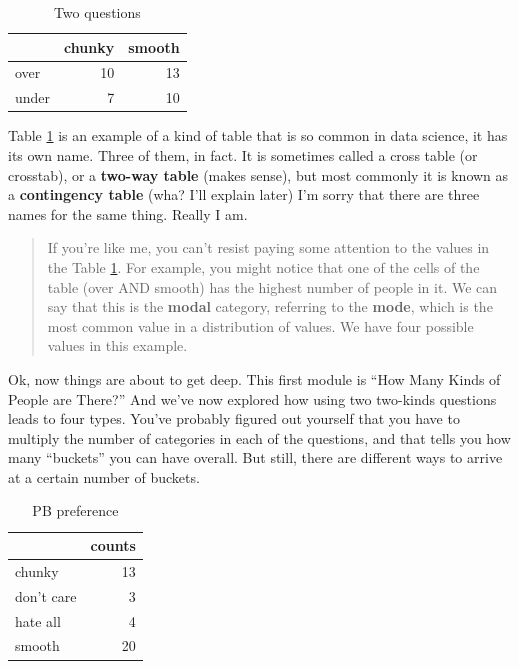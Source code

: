 \documentclass[openany]{book}
\begin{document}
\begin{table}[!h]

\caption{\label{tab:tpxpb}Two questions}
\centering
\begin{tabular}[t]{lrr}
\toprule
  & chunky & smooth\\
\midrule
over & 10 & 13\\
under & 7 & 10\\
\bottomrule
\end{tabular}
\end{table}

Table \ref{tab:tpxpb} is an example of a kind of table that is so common in data science, it has its own name. Three of them, in fact. It is sometimes called a cross table (or crosstab), or a \textbf{two-way table} (makes sense), but most commonly it is known as a \textbf{contingency table} (wha? I'll explain later) I'm sorry that there are three names for the same thing. Really I am.

\begin{quote}
If you're like me, you can't resist paying some attention to the values in the Table \ref{tab:tpxpb}. For example, you might notice that one of the cells of the table (over AND smooth) has the highest number of people in it. We can say that this is the \textbf{modal} category, referring to the \textbf{mode}, which is the most common value in a distribution of values. We have four possible values in this example.
\end{quote}

Ok, now things are about to get deep. This first module is ``How Many Kinds of People are There?'' And we've now explored how using two two-kinds questions leads to four types. You've probably figured out yourself that you have to multiply the number of categories in each of the questions, and that tells you how many ``buckets'' you can have overall. But still, there are different ways to arrive at a certain number of buckets.

\begin{table}[!h]

\caption{\label{tab:newpb}PB preference}
\centering
\begin{tabular}[t]{lr}
\toprule
 & counts\\
\midrule
chunky & 13\\
don't care & 3\\
hate all & 4\\
smooth & 20\\
\bottomrule
\end{tabular}
\end{table}
\end{document}
